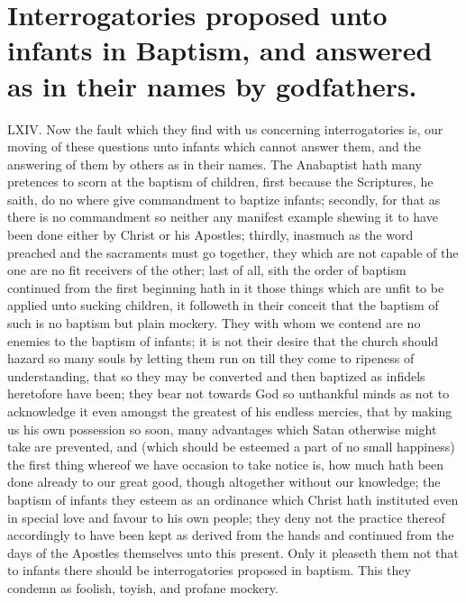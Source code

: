 \section*{Interrogatories proposed unto infants in Baptism, and answered as in their names by godfathers.}
LXIV. Now the fault which they find with us concerning interrogatories is, our moving of these questions unto infants which cannot answer them, and the answering of them by others as in their names.
The Anabaptist hath many pretences to scorn at the baptism of children, first because the Scriptures, he saith, do no where give commandment to baptize infants; secondly, for that as there is no commandment so neither any manifest example shewing it to have been done either by Christ or his Apostles; thirdly, inasmuch as the word preached and the sacraments must go together, they which are not capable of the one are no fit receivers of the other; last of all, sith the order of baptism continued from the first beginning hath in it those things which are unfit to be applied unto sucking children, it followeth in their conceit that the baptism of such is no baptism but plain mockery.
They with whom we contend are no enemies to the baptism of infants; it is not their desire that the church should hazard so many souls by letting them run on till they come to ripeness of understanding, that so they may be converted and then baptized as infidels heretofore have been; they bear not towards God so unthankful minds as not to acknowledge it even amongst the greatest of his endless mercies, that by making us his own possession so soon, many advantages which Satan otherwise might take are prevented, and (which should be esteemed a part of no small happiness) the first  thing whereof we have occasion to take notice is, how much hath been done already to our great good, though altogether without our knowledge; the baptism of infants they esteem as an ordinance which Christ hath instituted even in special love and favour to his own people; they deny not the practice thereof accordingly to have been kept as derived from the hands and continued from the days of the Apostles themselves unto this present. Only it pleaseth them not that to infants there should be interrogatories proposed in baptism. This they condemn as foolish, toyish, and profane mockery.

